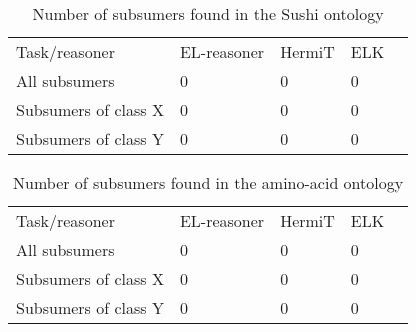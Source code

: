 \begin{table}[htb]
\centering
\caption{Number of subsumers found in the Sushi ontology}
\label{tab:sushiTest}
\begin{tabular}{|l|lll|l}
\cline{1-4}
Task/reasoner        & EL-reasoner & HermiT & ELK &  \\ \cline{1-4}
All subsumers        & 0           & 0      & 0   &  \\ \cline{1-4}
Subsumers of class X & 0           & 0      & 0   &  \\ \cline{1-4}
Subsumers of class Y & 0           & 0      & 0   &  \\ \cline{1-4}
\end{tabular}
\end{table}

    \begin{table}[htb]
\centering
\caption{Number of subsumers found in the amino-acid ontology}
\label{tab:aminoAcidTest}
\begin{tabular}{|l|lll|l}
\cline{1-4}
Task/reasoner        & EL-reasoner & HermiT & ELK &  \\ \cline{1-4}
All subsumers        & 0           & 0      & 0   &  \\ \cline{1-4}
Subsumers of class X & 0           & 0      & 0   &  \\ \cline{1-4}
Subsumers of class Y & 0           & 0      & 0   &  \\ \cline{1-4}
\end{tabular}
\end{table}  